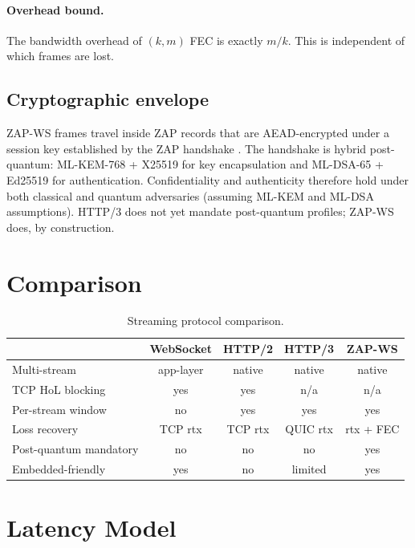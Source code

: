 \documentclass[11pt,a4paper]{article}
\begin{document}
\paragraph{Overhead bound.} The bandwidth overhead of $(k, m)$ FEC is
exactly $m/k$. This is independent of which frames are lost.

\subsection{Cryptographic envelope}

ZAP-WS frames travel inside ZAP records that are AEAD-encrypted under a
session key established by the ZAP handshake \cite{zap-handshake}. The
handshake is hybrid post-quantum: ML-KEM-768 + X25519 for key
encapsulation and ML-DSA-65 + Ed25519 for authentication. Confidentiality
and authenticity therefore hold under both classical and quantum
adversaries (assuming ML-KEM and ML-DSA assumptions). HTTP/3 does not yet
mandate post-quantum profiles; ZAP-WS does, by construction.

\section{Comparison}
\label{sec:comparison}

\begin{table}[h]
\centering
\small
\begin{tabular}{lcccc}
\toprule
                       & WebSocket & HTTP/2 & HTTP/3 & ZAP-WS \\
\midrule
Multi-stream           & app-layer & native & native  & native \\
TCP HoL blocking       & yes       & yes    & n/a     & n/a \\
Per-stream window      & no        & yes    & yes     & yes \\
Loss recovery          & TCP rtx   & TCP rtx& QUIC rtx& rtx + FEC \\
Post-quantum mandatory & no        & no     & no      & yes \\
Embedded-friendly      & yes       & no     & limited & yes \\
\bottomrule
\end{tabular}
\caption{Streaming protocol comparison.}
\end{table}

\section{Latency Model}
\label{sec:latency}
\end{document}
